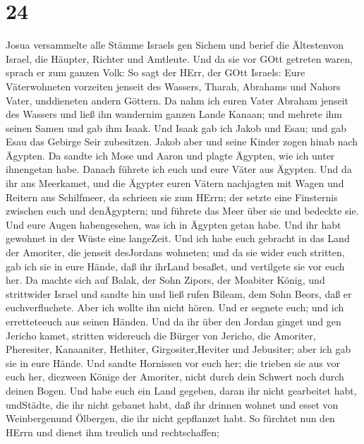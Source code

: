 \hypertarget{section-23}{%
\section{24}\label{section-23}}

 Josua versammelte alle Stämme Israels gen Sichem und berief
die Ältestenvon Israel, die Häupter, Richter und Amtleute. Und da sie
vor GOtt getreten waren,  sprach er zum ganzen Volk: So sagt
der HErr, der GOtt Israels: Eure Väterwohneten vorzeiten jenseit des
Wassers, Tharah, Abrahams und Nahors Vater, unddieneten andern Göttern.
 Da nahm ich euren Vater Abraham jenseit des Wassers und
ließ ihn wandernim ganzen Lande Kanaan; und mehrete ihm seinen Samen und
gab ihm Isaak.  Und Isaak gab ich Jakob und Esau; und gab
Esau das Gebirge Seir zubesitzen. Jakob aber und seine Kinder zogen
hinab nach Ägypten.  Da sandte ich Mose und Aaron und plagte
Ägypten, wie ich unter ihnengetan habe.  Danach führete ich
euch und eure Väter aus Ägypten. Und da ihr ans Meerkamet, und die
Ägypter euren Vätern nachjagten mit Wagen und Reitern ans Schilfmeer,
 da schrieen sie zum HErrn; der setzte eine Finsternis
zwischen euch und denÄgyptern; und führete das Meer über sie und
bedeckte sie. Und eure Augen habengesehen, was ich in Ägypten getan
habe. Und ihr habt gewohnet in der Wüste eine langeZeit. 
Und ich habe euch gebracht in das Land der Amoriter, die jenseit
desJordans wohneten; und da sie wider euch stritten, gab ich sie in eure
Hände, daß ihr ihrLand besaßet, und vertilgete sie vor euch her.
 Da machte sich auf Balak, der Sohn Zipors, der Moabiter
König, und strittwider Israel und sandte hin und ließ rufen Bileam, dem
Sohn Beors, daß er euchverfluchete.  Aber ich wollte ihn
nicht hören. Und er segnete euch; und ich erretteteeuch aus seinen
Händen.  Und da ihr über den Jordan ginget und gen Jericho
kamet, stritten widereuch die Bürger von Jericho, die Amoriter,
Pheresiter, Kanaaniter, Hethiter, Girgositer,Heviter und Jebusiter; aber
ich gab sie in eure Hände.  Und sandte Hornissen vor euch
her; die trieben sie aus vor euch her, diezween Könige der Amoriter,
nicht durch dein Schwert noch durch deinen Bogen.  Und habe
euch ein Land gegeben, daran ihr nicht gearbeitet habt, undStädte, die
ihr nicht gebauet habt, daß ihr drinnen wohnet und esset von
Weinbergenund Ölbergen, die ihr nicht gepflanzet habt.  So
fürchtet nun den HErrn und dienet ihm treulich und rechtschaffen;
